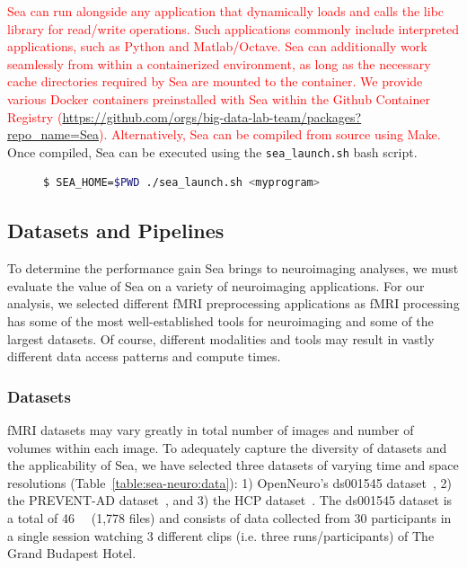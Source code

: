 \documentclass[pdflatex,sn-mathphys-num]{sn-jnl}
\newcommand{\vhs}[1]{\textcolor{red}{#1}}
\theoremstyle{thmstyleone}%
\theoremstyle{thmstyletwo}%
\theoremstyle{thmstylethree}%
\begin{document}
    
    \vhs{Sea can run alongside any application that dynamically loads and calls the libc library for read/write operations. Such applications commonly include interpreted applications, such as Python and Matlab/Octave. Sea can additionally work seamlessly from within a containerized environment, as long as the necessary cache directories required by Sea are mounted to the container. We provide various Docker containers preinstalled with Sea within the Github Container Registry (\url{https://github.com/orgs/big-data-lab-team/packages?repo_name=Sea}). Alternatively, Sea can be compiled from source using Make.} Once
    compiled, Sea can be executed using the \texttt{sea\_launch.sh} bash script.
    
        \begin{figure}
      \centering
       \begin{lstlisting}[language=bash,frame=single,
    backgroundcolor=\color{verylightgrey}, caption={Example Sea deployment command}, basicstyle=\ttfamily, label=lst:launch]
        $ SEA_HOME=$PWD ./sea_launch.sh <myprogram>
      \end{lstlisting}
    \end{figure}
    
    \subsection{Datasets and Pipelines}
    
    To determine the performance gain Sea brings to neuroimaging analyses, we
    must evaluate the value of Sea on a variety of neuroimaging applications.
    For our analysis, we selected different fMRI preprocessing applications as
    fMRI processing has some of the most well-established tools for neuroimaging
    and some of the largest datasets. Of course, different modalities and tools
    may result in vastly different data access patterns and compute times.
    
    \subsubsection{Datasets}
    fMRI datasets may vary greatly in total number of images and number of
    volumes within each image. To adequately capture the diversity of datasets
    and the applicability of Sea, we have selected three datasets of varying
    time and space resolutions (Table~\ref{table:sea-neuro:data}): 1)
    OpenNeuro's ds001545 dataset~\cite{ds001545}, 2) the PREVENT-AD
    dataset~\cite{preventad}, and 3) the HCP dataset~\cite{HCP}. The ds001545
    dataset is a total of \SI{46}{\giga\byte} (1,778 files) and consists of data
    collected from 30 participants in a single session watching 3 different
    clips (i.e. three runs/participants) of The Grand Budapest Hotel.
    
\end{document}
